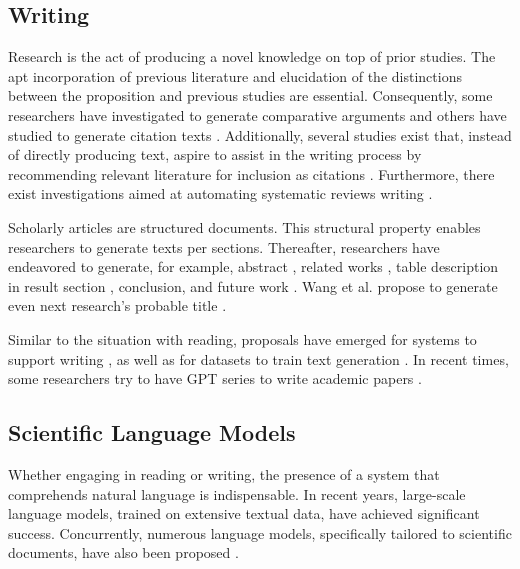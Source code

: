 \documentclass{book}
\begin{document}
\subsection{Writing}
Research is the act of producing a novel knowledge on top of prior studies. The apt incorporation of previous literature and elucidation of the distinctions between the proposition and previous studies are essential. Consequently, some researchers have investigated to generate comparative arguments \cite{yu2022scientific} and others have studied to generate citation texts \cite{arita2022citation,gu2022controllable,wang2021autocite,xing2020automatic,funkquist2022citebench}. Additionally, several studies exist that, instead of directly producing text, aspire to assist in the writing process by recommending relevant literature for inclusion as citations \cite{farber2020citation,zhang2020dual,duma2019contextual,farber2018cite,gosangi2021use}. Furthermore, there exist investigations aimed at automating systematic reviews writing \cite{dones2022systematic}.

Scholarly articles are structured documents. This structural property enables researchers to generate texts per sections. Thereafter, 
researchers have endeavored to generate, for example, abstract \cite{kumarasinghe2022automatic,gao2022comparing,wang2019paperrobot}, related works \cite{li2022automatic,shah2021generating}, table description in result section \cite{moosavi2021scigen,moosavi2021learning}, conclusion, and future work \cite{wang2019paperrobot}. Wang et al. propose to generate even next research's probable title \cite{wang2019paperrobot}.

Similar to the situation with reading, proposals have emerged for systems to support writing \cite{narimatsu2021task}, as well as for datasets to train text generation \cite{chen2021scixgen}. In recent times, some researchers try to have GPT series to write academic papers \cite{transformer2022can}. 

\subsection{Scientific Language Models}

Whether engaging in reading or writing, the presence of a system that comprehends natural language is indispensable. In recent years, large-scale language models, trained on extensive textual data, have achieved significant success. Concurrently, numerous language models, specifically tailored to scientific documents, have also been proposed \cite{beltagy2019scibert,singh2022scirepeval,nadkarni2021scientific,cohan2020specter,gupta2022matscibert,taylor2022galactica}.
\end{document}
